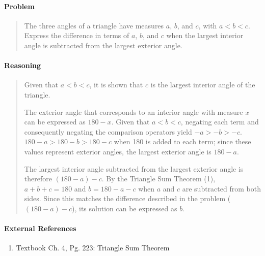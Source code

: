 \documentclass[letterpaper,12pt,twoside]{report}
\begin{document}
	\pagestyle{fancy}
	\fancyhf{}
	
	\paragraph{Problem}
	\begin{quote}
		\textsf{The three angles of a triangle have measures $a$, $b$, and $c$, with $a<b<c$.
			Express the difference in terms of $a$, $b$,
			and $c$ when the largest interior angle is
			subtracted from the largest exterior
			angle.}
	\end{quote}
	
	\begin{center}
		\begin{tikzpicture}
		\end{tikzpicture}
	\end{center}
	
	\paragraph{Reasoning}
	\begin{quotation}
		
		Given that $a<b<c$, it is shown that $c$ is the largest interior angle of the triangle.
		
		The exterior angle that corresponds to an interior angle with measure $x$ can be expressed as $180-x$. Given that $a<b<c$, negating each term and consequently negating the comparison operators yield $-a>-b>-c$. $180-a>180-b>180-c$ when 180 is added to each term; since these values represent exterior angles, the largest exterior angle is $180-a$.
		
		The largest interior angle subtracted from the largest exterior angle is therefore $(180-a)-c$. By the Triangle Sum Theorem (1), $a+b+c=180$ and $b=180-a-c$ when $a$ and $c$ are subtracted from both sides. Since this matches the difference described in the problem ($(180-a)-c$), its solution can be expressed as $\boxed{b}$.
		
	\end{quotation}
	
	\paragraph{External References}
	
	\begin{enumerate}
		\item Textbook Ch. 4, Pg. 223: Triangle Sum Theorem
	\end{enumerate}
	
\end{document}
